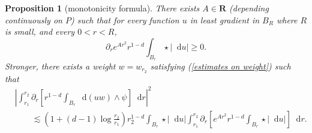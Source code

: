 \documentclass[reqno,12pt,letterpaper]{amsart}
\newcommand{\RR}{\mathbf{R}}
\newcommand*\dif{\mathop{}\!\mathrm{d}}
\newtheorem{proposition}[theorem]{Proposition}
\theoremstyle{definition}
\numberwithin{equation}{section}
\begin{document}
\begin{proposition}[monotonicity formula]\label{Monotonicity Formula}\label{sharp monotonicity}
There exists $A \in \RR$ (depending continuously on $P$) such that for every function $u$ in least gradient in $B_R$ where $R$ is small, and every $0 < r < R$,
\begin{equation}\label{weak monotone}
\partial_r e^{Ar^2} r^{1 - d} \int_{B_r} \star|\dif u| \geq 0.
\end{equation}
Stronger, there exists a weight $w = w_{r_2}$ satisfying (\ref{estimates on weight}) such that
\begin{align}\label{strong monotone}
&\left|\int_{r_1}^{r_2} \partial_r \left[r^{1 - d}\int_{B_r} \dif (uw) \wedge \psi\right] \dif r\right|^2 \\
&\qquad \lesssim \left(1 + (d - 1)\log\frac{r_2}{r_1}\right)r_2^{1 - d}\int_{B_r} \star |\dif u| \int_{r_1}^{r_2} \partial_r \left[e^{Ar^2} r^{1 - d}\int_{B_r} \star |\dif u|\right] \dif r.
\end{align}
\end{proposition}
\end{document}
